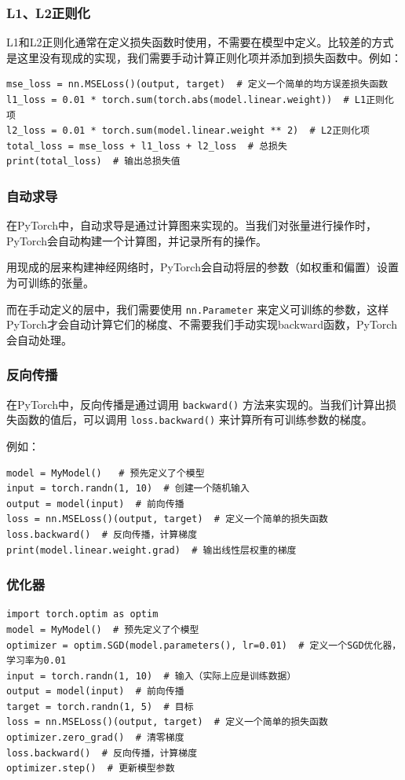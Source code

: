 \begin{frame}[fragile]
    \frametitle{L1、L2正则化}
    L1和L2正则化通常在定义损失函数时使用，不需要在模型中定义。比较差的方式是这里没有现成的实现，我们需要手动计算正则化项并添加到损失函数中。例如：
    \begin{verbatim}
mse_loss = nn.MSELoss()(output, target)  # 定义一个简单的均方误差损失函数
l1_loss = 0.01 * torch.sum(torch.abs(model.linear.weight))  # L1正则化项
l2_loss = 0.01 * torch.sum(model.linear.weight ** 2)  # L2正则化项
total_loss = mse_loss + l1_loss + l2_loss  # 总损失
print(total_loss)  # 输出总损失值
    \end{verbatim}
\end{frame}

\begin{frame}[fragile]
    \frametitle{自动求导}

    在PyTorch中，自动求导是通过计算图来实现的。当我们对张量进行操作时，PyTorch会自动构建一个计算图，并记录所有的操作。

    用现成的层来构建神经网络时，PyTorch会自动将层的参数（如权重和偏置）设置为可训练的张量。

    而在手动定义的层中，我们需要使用 \texttt{nn.Parameter} 来定义可训练的参数，这样PyTorch才会自动计算它们的梯度、不需要我们手动实现backward函数，PyTorch会自动处理。

\end{frame}


\begin{frame}[fragile]
    \frametitle{反向传播}

    在PyTorch中，反向传播是通过调用 \texttt{backward()} 方法来实现的。当我们计算出损失函数的值后，可以调用 \texttt{loss.backward()} 来计算所有可训练参数的梯度。

    例如：
    \begin{verbatim}
model = MyModel()   # 预先定义了个模型
input = torch.randn(1, 10)  # 创建一个随机输入
output = model(input)  # 前向传播
loss = nn.MSELoss()(output, target)  # 定义一个简单的损失函数
loss.backward()  # 反向传播，计算梯度
print(model.linear.weight.grad)  # 输出线性层权重的梯度
    \end{verbatim}

\end{frame}

\begin{frame}[fragile]
    \frametitle{优化器}

    \begin{verbatim}
import torch.optim as optim
model = MyModel()  # 预先定义了个模型
optimizer = optim.SGD(model.parameters(), lr=0.01)  # 定义一个SGD优化器，学习率为0.01
input = torch.randn(1, 10)  # 输入（实际上应是训练数据）
output = model(input)  # 前向传播
target = torch.randn(1, 5)  # 目标
loss = nn.MSELoss()(output, target)  # 定义一个简单的损失函数
optimizer.zero_grad()  # 清零梯度
loss.backward()  # 反向传播，计算梯度
optimizer.step()  # 更新模型参数
    \end{verbatim}

\end{frame}


